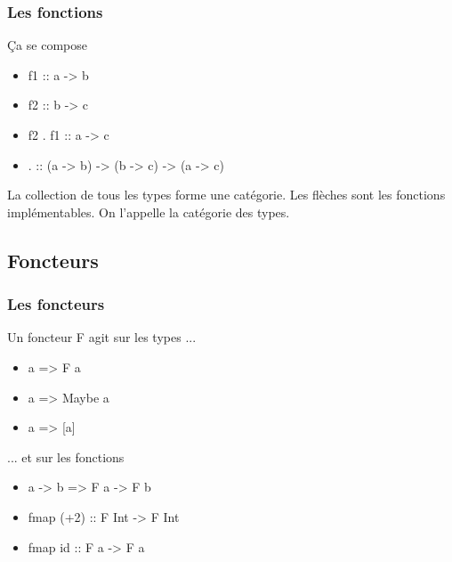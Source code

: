 \documentclass{beamer}
\begin{document}
\begin{frame}
\frametitle{Les fonctions}
\begin{block}{Ça se compose}
\begin{itemize}
\item f1 :: a -> b
\item f2 :: b -> c
\item f2 . f1 :: a -> c
\pause
\item . :: (a -> b) -> (b -> c) -> (a -> c)
\end{itemize}
\end{block}
\pause

La collection de tous les types forme une catégorie. Les flèches sont les fonctions implémentables. On l’appelle la catégorie des types.

\end{frame}

\subsection{Foncteurs}


\begin{frame}
\frametitle{Les foncteurs}
\begin{block}{Un foncteur F agit sur les types ...}
\begin{itemize}
\item a => F a
\end{itemize}
\end{block}
\begin{exampleblock}{}
\begin{itemize}
\item a => Maybe a
\item a => [a]
\end{itemize}
\end{exampleblock}

\pause

\begin{block}{... et sur les fonctions}
\begin{itemize}
\item a -> b => F a -> F b
\end{itemize}
\end{block}

\begin{exampleblock}{}
\begin{itemize}
\item fmap (+2) :: F Int -> F Int
\item fmap id :: F a -> F a
\end{itemize}
\end{exampleblock}
\end{frame}
\end{document}
